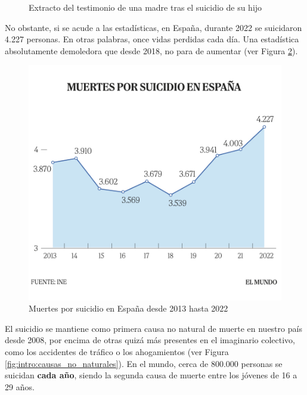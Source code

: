 \begin{figure}[h]
\begin{subfigure}[b]{0.49\textwidth}
        \end{subfigure}
        \caption[Extracto del testimonio de una madre tras el suicidio de su hijo]{Extracto del testimonio de una madre tras el suicidio de su hijo \cite{irene_pujol_i_athenea_hace_2021}}
        \label{fig:intro_testimonio_madre}
    \end{figure}

    No obstante, si se acude a las estadísticas, en España, durante 2022 se suicidaron 4.227 personas. En otras palabras, once vidas perdidas cada día. Una estadística absolutamente demoledora que desde 2018, no para de aumentar (ver Figura \ref{fig:intro:muertes_suicidio}).
    
    \begin{figure}[h]
        \centering
        \includegraphics[width=0.66\linewidth]{figures/muertes_suicidio.jpg}
        \caption[Muertes por suicidio en España desde 2013 hasta 2022]{Muertes por suicidio en España desde 2013 hasta 2022 \cite{saiz_4227_2023}}
        \label{fig:intro:muertes_suicidio}
    \end{figure}

    El suicidio se mantiene como primera causa no natural de muerte en nuestro país desde 2008, por encima de otras quizá más presentes en el imaginario colectivo, como los accidentes de tráfico o los ahogamientos (ver Figura \ref{fig:intro:causas_no_naturales}).  En el mundo, cerca de 800.000 personas se suicidan \textbf{cada año}, siendo la segunda causa de muerte entre los jóvenes de 16 a 29 años. \cite{confederacion_salud_mental_espana_salud_nodate}
    
